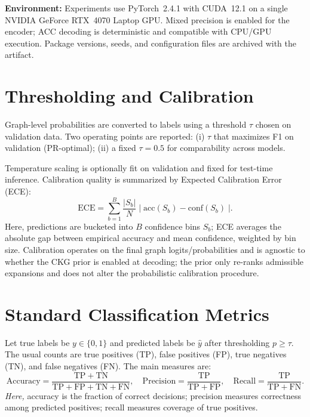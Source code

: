 \documentclass{buthesis}
\begin{document}
\textbf{Environment:}
Experiments use PyTorch~2.4.1 with CUDA~12.1 on a single NVIDIA GeForce RTX~4070 Laptop GPU. Mixed precision is enabled for the encoder; ACC decoding is deterministic and compatible with CPU/GPU execution. Package versions, seeds, and configuration files are archived with the artifact.

\section{Thresholding and Calibration}
\label{sec:eval-calibration}

Graph-level probabilities are converted to labels using a threshold \(\tau\) chosen on validation data. Two operating points are reported:
(i) \(\tau\) that maximizes F1 on validation (PR-optimal);
(ii) a fixed \(\tau=0.5\) for comparability across models.

Temperature scaling is optionally fit on validation and fixed for test-time inference. Calibration quality is summarized by Expected Calibration Error (ECE):
\begin{equation}
\label{eq:ece}
\mathrm{ECE}=\sum_{b=1}^{B}\frac{|S_b|}{N}\;\big|\;\mathrm{acc}(S_b)-\mathrm{conf}(S_b)\;\big|.
\end{equation}
Here, predictions are bucketed into \(B\) confidence bins \(S_b\); ECE averages the absolute gap between empirical accuracy and mean confidence, weighted by bin size. 
Calibration operates on the final graph logits/probabilities and is agnostic to whether the CKG prior is enabled at decoding; the prior only re-ranks admissible expansions and does not alter the probabilistic calibration procedure.


\section{Standard Classification Metrics}
\label{sec:eval-standard}

Let true labels be \(y\in\{0,1\}\) and predicted labels be \(\hat{y}\) after thresholding \(p\ge \tau\). The usual counts are true positives (TP), false positives (FP), true negatives (TN), and false negatives (FN). The main measures are:
\begin{equation}
\label{eq:std-acc-pre-rec}
\mathrm{Accuracy}=\frac{\mathrm{TP}+\mathrm{TN}}{\mathrm{TP}+\mathrm{FP}+\mathrm{TN}+\mathrm{FN}},\quad
\mathrm{Precision}=\frac{\mathrm{TP}}{\mathrm{TP}+\mathrm{FP}},\quad
\mathrm{Recall}=\frac{\mathrm{TP}}{\mathrm{TP}+\mathrm{FN}}.
\end{equation}
\textit{Here,} accuracy is the fraction of correct decisions; precision measures correctness among predicted positives; recall measures coverage of true positives.
\end{document}
